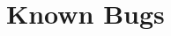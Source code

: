 \documentclass{acm_proc_article-sp}
\begin{document}
%
%
%
%
%
%
%
%
%
%









\section{Known Bugs}
\end{document}
